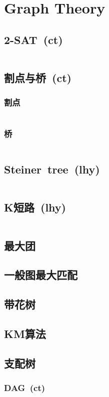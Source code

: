 \chapter{Graph Theory}
\section{2-SAT\ \small(ct)}
	\inputminted{cpp}{GraphTheory/2_sat.cpp}
\section{割点与桥\ \small(ct)}
	\subsection*{割点}
		\inputminted{cpp}{GraphTheory/cut_point.cpp}
	\subsection*{桥}
		\inputminted{cpp}{GraphTheory/bridge.cpp}
\section{Steiner\ tree\ \small(lhy)}
	\inputminted{cpp}{GraphTheory/steiner_tree.cpp}
\section{K短路\ \small(lhy)}
	\inputminted{cpp}{GraphTheory/kth_minimum_path.cpp}
\section{最大团}
\section{一般图最大匹配}
\section{带花树}
\section{KM算法}
\section{支配树}
	\subsection*{DAG\ \small(ct)}
		\inputminted{cpp}{GraphTheory/dominate_tree_dag.cpp}
